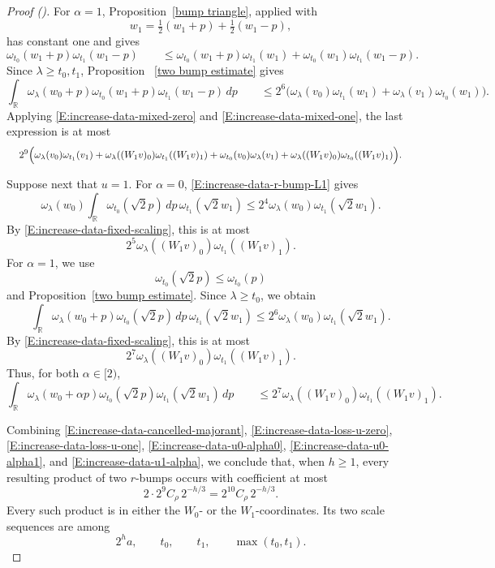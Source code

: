 \documentclass[12pt,reqno]{amsart}
\newcommand{\auto}{{({\tiny\faCar})}}
\theoremstyle{plain}
\numberwithin{equation}{section}
\theoremstyle{remark}
\begin{document}
\begin{proof}[Proof \auto]
For \(\alpha=1\), Proposition~\ref{bump triangle}, applied with
\[
w_1
=
\tfrac12(w_1+p)+\tfrac12(w_1-p),
\]
has constant one and gives
\begin{equation}
    \label{E:increase-data-narrow-triangle}
    \omega_{t_0}(w_1+p) \omega_{t_1}(w_1-p) \qquad\leq \omega_{t_0}(w_1+p)\omega_{t_1}(w_1) + \omega_{t_0}(w_1)\omega_{t_1}(w_1-p).
\end{equation}
Since \(\lambda\geq t_0,t_1\), Proposition~
\ref{two bump estimate} gives
\[
\int_{\mathbb R} \omega_\lambda(w_0+p) \omega_{t_0}(w_1+p) \omega_{t_1}(w_1-p)\,dp \qquad\leq 2^6\Big( \omega_\lambda(v_0)\omega_{t_1}(w_1) + \omega_\lambda(v_1)\omega_{t_0}(w_1) \Big).
\]
Applying \eqref{E:increase-data-mixed-zero} and
\eqref{E:increase-data-mixed-one}, the last expression is at most
\begin{equation}
    \label{E:increase-data-u0-alpha1}
    \resizebox{0.98\textwidth}{!}{$\displaystyle 2^9\Big( \omega_\lambda(v_0)\omega_{t_1}(v_1) + \omega_\lambda((W_1v)_0) \omega_{t_1}((W_1v)_1) + \omega_{t_0}(v_0)\omega_\lambda(v_1) + \omega_\lambda((W_1v)_0) \omega_{t_0}((W_1v)_1) \Big).$}
\end{equation}

Suppose next that \(u=1\). For \(\alpha=0\),
\eqref{E:increase-data-r-bump-L1} gives
\[
\omega_\lambda(w_0)
\int_{\mathbb R}\omega_{t_0}(\sqrt2p)\,dp\,
\omega_{t_1}(\sqrt2w_1)
\leq
2^4\omega_\lambda(w_0)\omega_{t_1}(\sqrt2w_1).
\]
By \eqref{E:increase-data-fixed-scaling}, this is at most
\[
2^5\omega_\lambda((W_1v)_0)\omega_{t_1}((W_1v)_1).
\]
For \(\alpha=1\), we use
\[
\omega_{t_0}(\sqrt2p)\leq\omega_{t_0}(p)
\]
and Proposition~\ref{two bump estimate}. Since
\(\lambda\geq t_0\), we obtain
\[
\int_{\mathbb R}\omega_\lambda(w_0+p)\omega_{t_0}(\sqrt2p)\,dp\,
\omega_{t_1}(\sqrt2w_1)
\leq
2^6\omega_\lambda(w_0)\omega_{t_1}(\sqrt2w_1).
\]
By \eqref{E:increase-data-fixed-scaling}, this is at most
\[
2^7\omega_\lambda((W_1v)_0)\omega_{t_1}((W_1v)_1).
\]
Thus, for both \(\alpha\in[2)\),
\begin{equation}
    \label{E:increase-data-u1-alpha}
    \int_{\mathbb R} \omega_\lambda(w_0+\alpha p) \omega_{t_0}(\sqrt2p) \omega_{t_1}(\sqrt2w_1)\,dp \qquad\leq 2^7 \omega_\lambda((W_1v)_0) \omega_{t_1}((W_1v)_1).
\end{equation}

Combining
\eqref{E:increase-data-cancelled-majorant},
\eqref{E:increase-data-loss-u-zero},
\eqref{E:increase-data-loss-u-one},
\eqref{E:increase-data-u0-alpha0},
\eqref{E:increase-data-u0-alpha1}, and
\eqref{E:increase-data-u1-alpha}, we conclude that, when
\(h\geq1\), every resulting product of two \(r\)-bumps occurs with
coefficient at most
\[
2\cdot2^9 C_\rho\,2^{-h/3}
=
2^{10}C_\rho\,2^{-h/3}.
\]
Every such product is in either the \(W_0\)- or the
\(W_1\)-coordinates. Its two scale sequences are among
\[
2^ha,\qquad
t_0,\qquad
t_1,\qquad
\max(t_0,t_1).
\]


\end{proof}
\end{document}
